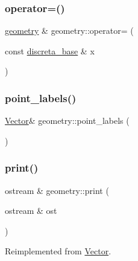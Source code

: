 \subsubsection{\texorpdfstring{operator=()}{operator=()}}
{\footnotesize\ttfamily \mbox{\hyperlink{classgeometry}{geometry}} \& geometry\+::operator= (\begin{DoxyParamCaption}\item[{const \mbox{\hyperlink{classdiscreta__base}{discreta\+\_\+base}} \&}]{x }\end{DoxyParamCaption})}

\mbox{\label{classgeometry_aa80150b549283d56c347b8533d9051b0}} 
\subsubsection{\texorpdfstring{point\+\_\+labels()}{point\_labels()}}
{\footnotesize\ttfamily \mbox{\hyperlink{class_vector}{Vector}}\& geometry\+::point\+\_\+labels (\begin{DoxyParamCaption}{ }\end{DoxyParamCaption})\hspace{0.3cm}{\ttfamily [inline]}}

\mbox{\label{classgeometry_af92f963887d22dd3437f585df929208d}} 
\subsubsection{\texorpdfstring{print()}{print()}}
{\footnotesize\ttfamily ostream \& geometry\+::print (\begin{DoxyParamCaption}\item[{ostream \&}]{ost }\end{DoxyParamCaption})\hspace{0.3cm}{\ttfamily [virtual]}}



Reimplemented from \mbox{\hyperlink{class_vector_a71d7e24bcfdfc69d4a2137360acb066c}{Vector}}.

\mbox{\label{classgeometry_a8f5356989decb76fddb4926714240c0d}} 
